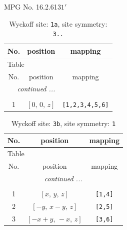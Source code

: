 \documentclass[fleqn,8pt]{jsarticle}
\begin{document}
\setcounter{MaxMatrixCols}{32}

\renewcommand{\tablename}{Table~}
\renewcommand{\figurename}{Figure~}
\begin{center}
\LARGE
MPG No. 16.2.61\quad$31'$
\end{center}
\renewcommand{\arraystretch}{1.2}
\begin{longtable}{ccc}
\caption{Wyckoff site: {\tt 1a}, site symmetry: {\tt 3..}}
 \\
 \hline \hline
No. & position & mapping \\ \hline \endfirsthead

\multicolumn{2}{l}{\tablename\ \thetable{}} \\
 \hline \hline
No. & position & mapping \\ \hline \endhead

 \hline \hline
\multicolumn{2}{r}{\footnotesize\it continued ...} \\ \endfoot

 \hline \hline
\multicolumn{2}{r}{} \\ \endlastfoot

1 & $\left[ 0,\, 0,\, z \right]$ & {\tt [1,2,3,4,5,6]} \\
\end{longtable}
\renewcommand{\arraystretch}{1.2}
\begin{longtable}{ccc}
\caption{Wyckoff site: {\tt 3b}, site symmetry: {\tt 1}}
 \\
 \hline \hline
No. & position & mapping \\ \hline \endfirsthead

\multicolumn{2}{l}{\tablename\ \thetable{}} \\
 \hline \hline
No. & position & mapping \\ \hline \endhead

 \hline \hline
\multicolumn{2}{r}{\footnotesize\it continued ...} \\ \endfoot

 \hline \hline
\multicolumn{2}{r}{} \\ \endlastfoot

1 & $\left[ x,\, y,\, z \right]$ & {\tt [1,4]} \\ \hline
2 & $\left[ - y,\, x - y,\, z \right]$ & {\tt [2,5]} \\ \hline
3 & $\left[ - x + y,\, - x,\, z \right]$ & {\tt [3,6]} \\
\end{longtable}
\end{document}
